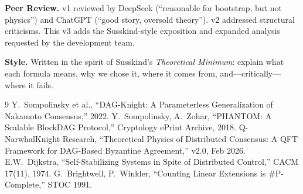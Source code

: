 \documentclass[11pt,a4paper]{article}
\begin{document}
\vspace{0.2cm}
{\small\textbf{Peer Review.} v1 reviewed by DeepSeek (``reasonable for bootstrap, but not physics'') and ChatGPT (``good story, oversold theory''). v2 addressed structural criticisms. This v3 adds the Susskind-style exposition and expanded analysis requested by the development team.}

\vspace{0.2cm}
{\small\textbf{Style.} Written in the spirit of Susskind's \emph{Theoretical Minimum}: explain what each formula means, why we chose it, where it comes from, and---critically---where it fails.}

\begin{thebibliography}{9}
\small
{} Y.~Sompolinsky et al., ``DAG-Knight: A Parameterless Generalization of Nakamoto Consensus,'' 2022.
 Y.~Sompolinsky, A.~Zohar, ``PHANTOM: A Scalable BlockDAG Protocol,'' Cryptology ePrint Archive, 2018.
 Q-NarwhalKnight Research, ``Theoretical Physics of Distributed Consensus: A QFT Framework for DAG-Based Byzantine Agreement,'' v2.0, Feb 2026.
 E.W.~Dijkstra, ``Self-Stabilizing Systems in Spite of Distributed Control,'' CACM 17(11), 1974.
 G.~Brightwell, P.~Winkler, ``Counting Linear Extensions is \#P-Complete,'' STOC 1991.
\end{thebibliography}
\end{document}
